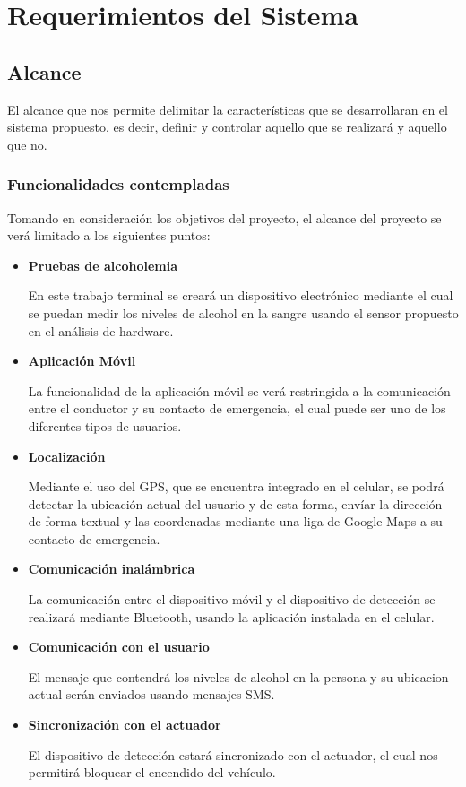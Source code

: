 \section{Requerimientos del Sistema}
\subsection{Alcance}
El alcance que nos permite delimitar la características que se desarrollaran en el sistema propuesto, es decir,
definir y controlar aquello que se realizará y aquello que no.
	\subsubsection{Funcionalidades contempladas}
	Tomando en consideración los objetivos del proyecto, el alcance del proyecto se verá limitado a los siguientes puntos: \par
		\begin{itemize}
			\item {\textbf{Pruebas de alcoholemia} \par En este trabajo terminal se creará un dispositivo electrónico mediante el cual se puedan medir los niveles de alcohol en la sangre usando el sensor propuesto en el análisis de hardware.}
			\item {\textbf{Aplicación Móvil} \par La funcionalidad de la aplicación móvil se verá restringida a la comunicación entre el conductor y su contacto de emergencia, el cual puede ser uno de los diferentes tipos de usuarios.}
			\item {\textbf{Localización} \par Mediante el uso del GPS, que se encuentra integrado en el celular, se podrá detectar la ubicación actual del usuario y de esta forma, envíar la dirección de forma textual y las coordenadas mediante una liga de Google Maps a su contacto de emergencia.}
			\item {\textbf{Comunicación inalámbrica} \par La comunicación entre el dispositivo móvil y el dispositivo de detección se realizará mediante Bluetooth, usando la aplicación instalada en el celular.}
 			\item {\textbf{Comunicación con el usuario} \par El mensaje que contendrá los niveles de alcohol en la persona y su ubicacion actual serán enviados usando mensajes SMS.}
 			\item{\textbf{Sincronización con el actuador} \par El dispositivo de detección estará sincronizado con el actuador, el cual nos permitirá bloquear el encendido del vehículo.}
		\end{itemize}
